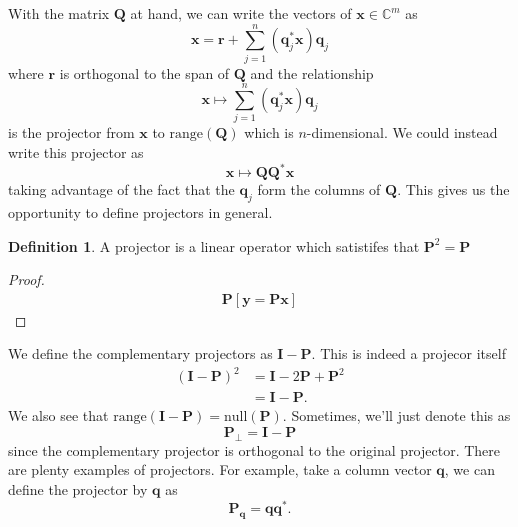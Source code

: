 \documentclass[12pt]{article}
\newcommand{\bbC}{\mathbb{C}}
\renewcommand{\vec}[1]{\mathbf{#1}}
\theoremstyle{definition}
\newtheorem{defn}[thm]{Definition}
\theoremstyle{remark}
\numberwithin{equation}{section}
\begin{document}
With the matrix $\vec{Q}$ at hand, we can write the vectors of $\vec{x}\in\bbC^m$ as 
\begin{equation}
  \vec{x} = \vec{r} + \sum_{j=1}^n (\vec{q}_j ^* \vec{x}) \vec{q}_j
\end{equation}
where $\vec{r}$ is orthogonal to the span of $\vec{Q}$ and the relationship
\begin{equation}
  \vec{x} \mapsto \sum_{j=1}^n (\vec{q}_j ^* \vec{x}) \vec{q}_j
\end{equation}
is the projector from $\vec{x}$ to $\text{range}(\vec{Q})$ which is $n$-dimensional. We could instead write this projector as 
\begin{equation}
  \vec{x} \mapsto \vec{QQ}^*\vec{x}
\end{equation}
taking advantage of the fact that the $\vec{q}_j$ form the columns of $\vec{Q}$. This gives us the opportunity to define projectors in general.

\begin{defn}
  A projector is a linear operator which satistifes that $\vec{P}^2 = \vec{P}$
\end{defn}

\begin{proof}
  \begin{align}
    \vec{P}[ \vec{y} = \vec{Px} ]
  \end{align}
\end{proof}

We define the complementary projectors as $\vec{I}- \vec{P}$. This is indeed a projecor itself
\begin{align}
  (\vec{I} - \vec{P})^2 &= \vec{I} -2 \vec{P} + \vec{P}^2\\
                        &= \vec{I} - \vec{P}.
\end{align}
We also see that $\text{range}(\vec{I} - \vec{P}) = \text{null}(\vec{P})$. Sometimes, we'll just denote this as 
\begin{equation}
  \vec{P}_\perp = \vec{I}-\vec{P}
\end{equation}
since the complementary projector is orthogonal to the original projector. There are plenty examples of projectors. For example, take a column vector $\vec{q}$, we can define the projector by $\vec{q}$ as
\begin{equation}
  \vec{P}_{\vec{q}} = \vec{q}\vec{q}^*. 
\end{equation}

\end{document}
